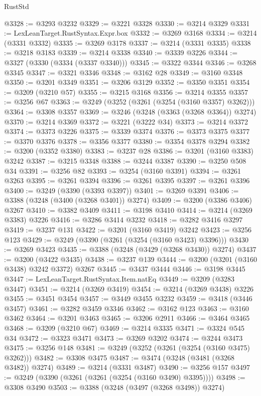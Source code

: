 \begin{lexlean}{RustStd}
\begin{coremodule}
{\begin{coremodule}
{{{{{{{{{{{{{{{{{{{{{{{{{@3328 := @3293 @3232
@3329 := @3221 @3328
@3330 := @3214 @3329
@3331 := LexLeanTarget.RustSyntax.Expr.box
@3332 := @3269 @3168
@3334 := @3214 (@3331 @3332)
@3335 := @3269 @3178
@3337 := @3214 (@3331 @3335)
@3338 := @3218 @3183
@3339 := @3214 @3338
@3340 := @3339 @3226
@3344 := @3327 (@3330 (@3334 (@3337 @3340)))
@3345 := @3322 @3344
@3346 := @3268 @3345
@3347 := @3321 @3346
@3348 := @3162 @28
@3349 := @3160 @3348
@3350 := @3201 @3349
@3351 := @3206 @3129
@3352 := @3350 @3351
@3354 := @3209 (@3210 @57)
@3355 := @3215 @3168
@3356 := @3214 @3355
@3357 := @3256 @67
@3363 := @3249 (@3252 (@3261 (@3254 (@3160 @3357) @3262)))
@3364 := @3308 @3357
@3369 := @3246 (@3248 (@3363 (@3268 @3364)) @3274)
@3370 := @3214 @3369
@3372 := @3221 (@3222 @34)
@3373 := @3214 @3372
@3374 := @3373 @3226
@3375 := @3339 @3374
@3376 := @3373 @3375
@3377 := @3370 @3376
@3378 := @3356 @3377
@3380 := @3354 @3378 @3294
@3382 := @3200 (@3352 @3380)
@3383 := @3237 @28
@3386 := @3201 (@3160 @3383) @3242
@3387 := @3215 @3348
@3388 := @3244 @3387
@3390 := @3250 @508 @34
@3391 := @3256 @82
@3393 := @3254 (@3160 @3391)
@3394 := @3261 @3263
@3395 := @3261 @3394
@3396 := @3261 @3395
@3397 := @3261 @3396
@3400 := @3249 (@3390 (@3393 @3397))
@3401 := @3269 @3391
@3406 := @3388 (@3248 (@3400 (@3268 @3401)) @3274)
@3409 := @3200 (@3386 @3406) @3267
@3410 := @3382 @3409
@3411 := @3198 @3410
@3414 := @3214 (@3269 @3383) @3226
@3416 := @3286 @3414 @3232
@3418 := @3282 @3416 @3297
@3419 := @3237 @131
@3422 := @3201 (@3160 @3419) @3242
@3423 := @3256 @123
@3429 := @3249 (@3390 (@3261 (@3254 (@3160 @3423) @3396)))
@3430 := @3269 @3423
@3435 := @3388 (@3248 (@3429 (@3268 @3430)) @3274)
@3437 := @3200 (@3422 @3435)
@3438 := @3237 @139
@3444 := @3200 (@3201 (@3160 @3438) @3242 @3372) @3267
@3445 := @3437 @3444
@3446 := @3198 @3445
@3447 := LexLeanTarget.RustSyntax.Item.natEq
@3449 := @3209 (@3283 @3447)
@3451 := @3214 (@3269 @3419)
@3454 := @3214 (@3269 @3438) @3226
@3455 := @3451 @3454
@3457 := @3449 @3455 @3232
@3459 := @3418 (@3446 @3457)
@3461 := @3282 @3459 @3346
@3462 := @3162 @123
@3463 := @3160 @3462
@3464 := @3201 @3463
@3465 := @3206 @2911
@3466 := @3464 @3465
@3468 := @3209 (@3210 @67)
@3469 := @3214 @3335
@3471 := @3324 @545 @34
@3472 := @3323 @3471
@3473 := @3269 @3202
@3474 := @3244 @3473
@3475 := @3256 @148
@3481 := @3249 (@3252 (@3261 (@3254 (@3160 @3475) @3262)))
@3482 := @3308 @3475
@3487 := @3474 (@3248 (@3481 (@3268 @3482)) @3274)
@3489 := @3214 (@3331 @3487)
@3490 := @3256 @157
@3497 := @3249 (@3390 (@3261 (@3261 (@3254 (@3160 @3490) @3395))))
@3498 := @3308 @3490
@3503 := @3388 (@3248 (@3497 (@3268 @3498)) @3274)
}}}}}}}}}}}}}}}}}}}}}}}}}
\end{coremodule}}
\end{coremodule}
\end{lexlean}
